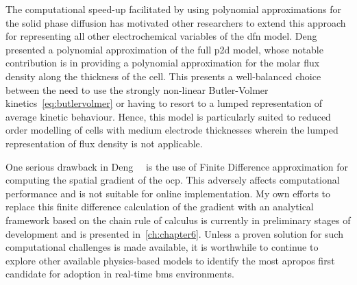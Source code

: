 

The computational  speed-up facilitated  by using polynomial  approximations for
the  solid  phase diffusion  has  motivated  other  researchers to  extend  this
approach for representing  all other electrochemical variables  of the \gls{dfn}
model. Deng~\etal{}~\cite{Deng2018} presented a  polynomial approximation of the
full \gls{p2d}  model, whose notable  contribution is in providing  a polynomial
approximation for  the molar flux  density along the  thickness of the  cell.
This  presents a  well-balanced  choice between  the need  to  use the  strongly
non-linear Butler-Volmer kinetics~\cref{eq:butlervolmer} or  having to resort to
a  lumped representation  of average  kinetic  behaviour. Hence,  this model  is
particularly suited  to reduced order  modelling of cells with  medium electrode
thicknesses wherein the lumped representation of flux density is not applicable.



One  serious  drawback in  Deng~\etal{}~\cite{Deng2018}  is  the use  of  Finite
Difference approximation  for computing the  spatial gradient of  the \gls{ocp}.
This  adversely  affects  computational  performance and  is  not  suitable  for
online  implementation.  My  own  efforts  to  replace  this  finite  difference
calculation of  the gradient  with an  analytical framework  based on  the chain
rule  of calculus  is  currently in  preliminary stages  of  development and  is
presented in~\cref{ch:chapter6}. Unless a proven solution for such computational
challenges is  made available,  it is  worthwhile to  continue to  explore other
available physics-based models to identify  the most apropos first candidate for
adoption in real-time \gls{bms} environments.


